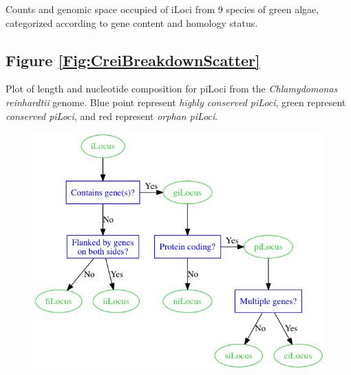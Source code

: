 \noindent
Counts and genomic space occupied of iLoci from 9 species of green algae, categorized according to gene content and homology status.

\subsection*{Figure \ref{Fig:CreiBreakdownScatter}}

\noindent
Plot of length and nucleotide composition for piLoci from the \textit{Chlamydomonas reinhardtii} genome. Blue point represent \textit{highly conserved piLoci}, green represent \textit{conserved piLoci}, and red represent \textit{orphan piLoci}.

\begin{figure}[!bht]
\includegraphics[width=6in]{Assets/Graphics/iLoci/ilocus-designations.png}
\centering
\caption{~}
\label{Fig:iLocusDesignations}
\end{figure}

